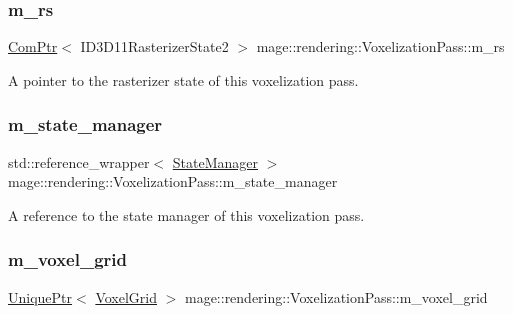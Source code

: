 \subsubsection{\texorpdfstring{m\+\_\+rs}{m\_rs}}
{\footnotesize\ttfamily \mbox{\hyperlink{namespacemage_ae74f374780900893caa5555d1031fd79}{Com\+Ptr}}$<$ I\+D3\+D11\+Rasterizer\+State2 $>$ mage\+::rendering\+::\+Voxelization\+Pass\+::m\+\_\+rs\hspace{0.3cm}{\ttfamily [private]}}

A pointer to the rasterizer state of this voxelization pass. \mbox{\label{classmage_1_1rendering_1_1_voxelization_pass_a449470bf0e0a246a2457b87289155330}} 
\subsubsection{\texorpdfstring{m\+\_\+state\+\_\+manager}{m\_state\_manager}}
{\footnotesize\ttfamily std\+::reference\+\_\+wrapper$<$ \mbox{\hyperlink{classmage_1_1rendering_1_1_state_manager}{State\+Manager}} $>$ mage\+::rendering\+::\+Voxelization\+Pass\+::m\+\_\+state\+\_\+manager\hspace{0.3cm}{\ttfamily [private]}}

A reference to the state manager of this voxelization pass. \mbox{\label{classmage_1_1rendering_1_1_voxelization_pass_a5263939327363598c9d628db79b3cc49}} 
\subsubsection{\texorpdfstring{m\+\_\+voxel\+\_\+grid}{m\_voxel\_grid}}
{\footnotesize\ttfamily \mbox{\hyperlink{namespacemage_a3316d7143a973e37adf1110f2e80ca31}{Unique\+Ptr}}$<$ \mbox{\hyperlink{classmage_1_1rendering_1_1_voxel_grid}{Voxel\+Grid}} $>$ mage\+::rendering\+::\+Voxelization\+Pass\+::m\+\_\+voxel\+\_\+grid\hspace{0.3cm}{\ttfamily [private]}}


